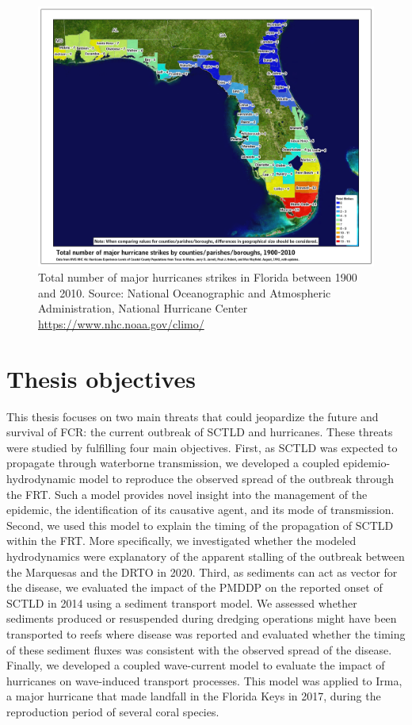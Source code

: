 \begin{figure}
    \centering
    \includegraphics[width=\textwidth]{chapters/intro/figures/hurricane_strikes.jpg}
    \caption{Total number of major hurricanes strikes in Florida between 1900 and 2010.  Source: National Oceanographic and Atmospheric Administration, National Hurricane Center \url{https://www.nhc.noaa.gov/climo/}}
    \label{inro:landfall}
\end{figure}

\section{Thesis objectives}

This thesis focuses on two main threats that could jeopardize the future and survival of FCR: the current outbreak of SCTLD and hurricanes. These threats were studied by fulfilling four main objectives. First, as SCTLD was expected to propagate through waterborne transmission, we developed a coupled epidemio-hydrodynamic model to reproduce the observed spread of the outbreak through the FRT. Such a model provides novel insight into the management of the epidemic, the identification of its causative agent, and its mode of transmission. Second, we used this model to explain the timing of the propagation of SCTLD within the FRT. More specifically, we investigated whether the modeled hydrodynamics were explanatory of the apparent stalling of the outbreak between the Marquesas and the DRTO in 2020. Third, as sediments can act as vector for the disease, we evaluated the impact of the PMDDP on the reported onset of SCTLD in 2014 using a sediment transport model. We assessed whether sediments produced or resuspended during dredging operations might have been transported to reefs where disease was reported and evaluated whether the timing of these sediment fluxes was consistent with the observed spread of the disease. Finally, we developed a coupled wave-current model to evaluate the impact of hurricanes on wave-induced transport processes. This model was applied to Irma, a major hurricane that made landfall in the Florida Keys in 2017, during the reproduction period of several coral species.

